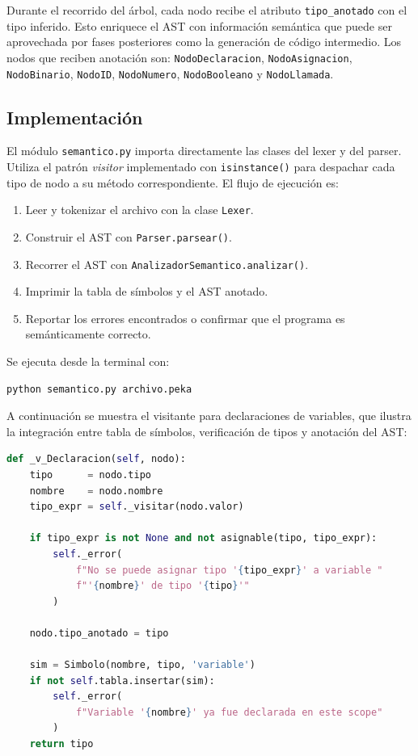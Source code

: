 \documentclass[12pt]{article}
\begin{document}
Durante el recorrido del árbol, cada nodo recibe el atributo
\texttt{tipo\_anotado} con el tipo inferido. Esto enriquece el
AST con información semántica que puede ser aprovechada por fases
posteriores como la generación de código intermedio. Los nodos
que reciben anotación son: \texttt{NodoDeclaracion},
\texttt{NodoAsignacion}, \texttt{NodoBinario}, \texttt{NodoID},
\texttt{NodoNumero}, \texttt{NodoBooleano} y \texttt{NodoLlamada}.

\subsection{Implementación}

El módulo \texttt{semantico.py} importa directamente las clases
del lexer y del parser. Utiliza el patrón \textit{visitor}
implementado con \texttt{isinstance()} para despachar cada tipo
de nodo a su método correspondiente. El flujo de ejecución es:

\begin{enumerate}
    \item Leer y tokenizar el archivo con la clase \texttt{Lexer}.
    \item Construir el AST con \texttt{Parser.parsear()}.
    \item Recorrer el AST con \texttt{AnalizadorSemantico.analizar()}.
    \item Imprimir la tabla de símbolos y el AST anotado.
    \item Reportar los errores encontrados o confirmar que el
          programa es semánticamente correcto.
\end{enumerate}

Se ejecuta desde la terminal con:

\begin{lstlisting}[language=bash, caption={Ejecución del analizador semántico}]
python semantico.py archivo.peka
\end{lstlisting}

A continuación se muestra el visitante para declaraciones de
variables, que ilustra la integración entre tabla de símbolos,
verificación de tipos y anotación del AST:

\begin{lstlisting}[language=Python,
    caption={Visitante para declaración de variable}]
def _v_Declaracion(self, nodo):
    tipo      = nodo.tipo
    nombre    = nodo.nombre
    tipo_expr = self._visitar(nodo.valor)

    if tipo_expr is not None and not asignable(tipo, tipo_expr):
        self._error(
            f"No se puede asignar tipo '{tipo_expr}' a variable "
            f"'{nombre}' de tipo '{tipo}'"
        )

    nodo.tipo_anotado = tipo

    sim = Simbolo(nombre, tipo, 'variable')
    if not self.tabla.insertar(sim):
        self._error(
            f"Variable '{nombre}' ya fue declarada en este scope"
        )
    return tipo
\end{lstlisting}
\end{document}

